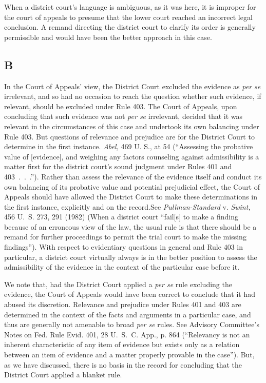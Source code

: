   When a district court's language is ambiguous, as it was here, it
is improper for the court of appeals to presume that the lower court
reached an incorrect legal conclusion. A remand directing the district
court to clarify its order is generally permissible and would have been
the better approach in this case.

\subsection{B}

  In the Court of Appeals' view, the District Court excluded the
evidence as \emph{per se} irrelevant, and so had no occasion to reach the
question whether such evidence, if relevant, should be excluded under
Rule 403. The Court of Appeals, upon concluding that such evidence
was not \emph{per se} irrelevant, de\newpage cided that it was relevant
in the circumstances of this case and undertook its own balancing
under Rule 403. But questions of relevance and prejudice are for the
District Court to determine in the first instance. \emph{Abel,} 469
U. S., at 54 (``Assessing the probative value of [evidence], and
weighing any factors counseling against admissibility is a matter
first for the district court's sound judgment under Rules 401 and
403~.~.~.''). Rather than assess the relevance of the evidence
itself and conduct its own balancing of its probative value and
potential prejudicial effect, the Court of Appeals should have allowed
the District Court to make these determinations in the first instance,
explicitly and on the record.\footnotemark[3] See \emph{Pullman-Standard} v.
\emph{Swint,} 456 U.~S. 273, 291 (1982) (When a district court ``fail[s]
to make a finding because of an erroneous view of the law, the usual
rule is that there should be a remand for further proceedings to permit
the trial court to make the missing findings''). With respect
to evidentiary questions in general and Rule 403 in particular, a
district court virtually always is in the better position to assess the
admissibility of the evidence in the context of the particular case
before it.

  We note that, had the District Court applied a \emph{per se} rule
excluding the evidence, the Court of Appeals would have been correct
to conclude that it had abused its discretion. Relevance and prejudice
under Rules 401 and 403 are determined in the context of the facts and
arguments in a particular case, and thus are generally not amenable to
broad \emph{per se} rules. See Advisory Committee's Notes on Fed. Rule
Evid. 401, 28 U.~S.~C. App., p. 864 (``Relevancy is not an inherent
characteristic of any item of evidence but exists only as a relation
between an item of evidence and a matter properly \newpage  provable in
the case''). But, as we have discussed, there is no basis in the
record for concluding that the District Court applied a blanket rule.

